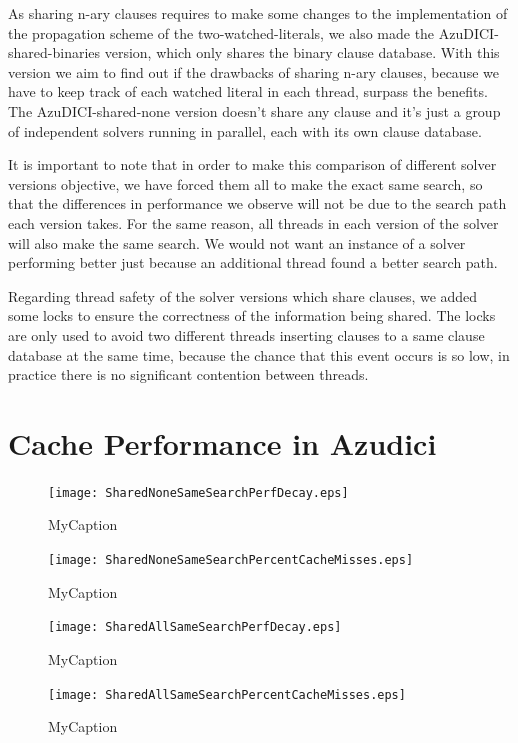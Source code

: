 \documentclass{llncs}
\begin{document}
As sharing n-ary clauses requires to make some changes to the
implementation of the propagation scheme of the two-watched-literals,
we also made the AzuDICI-shared-binaries version, which only shares
the binary clause database. With this version we aim to find out
if the drawbacks of sharing n-ary clauses, because we have to keep
track of each watched literal in each thread, surpass the benefits.
The AzuDICI-shared-none version doesn't share any clause and it's
just a group of independent solvers running in parallel, each with
its own clause database.

It is important to note that in order to make this comparison of
different solver versions objective, we have forced them all to make
the exact same search, so that the differences in performance we
observe will not be due to the search path each version takes.
For the same reason, all threads in each version of the solver will
also make the same search. We would not want an instance of a
solver performing better just because an additional thread found
a better search path.

Regarding thread safety of the solver versions which share clauses,
we added some locks to ensure the correctness of the information
being shared. The locks are only used to avoid two different threads
inserting clauses to a same clause database at the same time,
because the chance that this event occurs is so low, in practice
there is no significant contention between threads.

\section{Cache Performance in Azudici}

\begin{minipage}[h]{.5\linewidth}
  \begin{figure}[htp]
    \centering
    \texttt{[image: SharedNoneSameSearchPerfDecay.eps]}
    \caption{MyCaption}
    \label{fig:MyLabel}
  \end{figure}
  \begin{figure}[htp]
    \centering
    \texttt{[image: SharedNoneSameSearchPercentCacheMisses.eps]}
    \caption{MyCaption}
    \label{fig:MyLabel}
  \end{figure}
\end{minipage}


\begin{minipage}[h]{.5\linewidth}
  \begin{figure}[htp]
    \centering
    \texttt{[image: SharedAllSameSearchPerfDecay.eps]}
    \caption{MyCaption}
    \label{fig:MyLabel}
  \end{figure}
  \begin{figure}[htp]
    \centering
    \texttt{[image: SharedAllSameSearchPercentCacheMisses.eps]}
    \caption{MyCaption}
    \label{fig:MyLabel}
  \end{figure}
\end{minipage}
\end{document}
